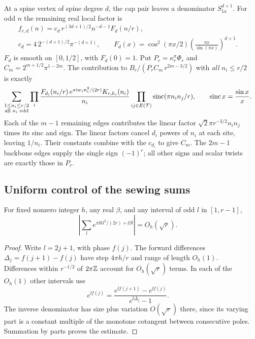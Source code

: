 At a spine vertex of spine degree \(d\), the cap pair leaves a denominator \(S_{1a}^{d+1}\). For odd \(n\) the remaining real local factor is
\[
\begin{gathered}
 f_{r,d}(n)=c_d\,r^{(3d+1)/2} n^{-d-1}F_d(n/r),\\[-1pt]
 c_d=4\,2^{-(d+1)/2}\pi^{-(d+1)},\qquad
 F_d(x)=\cos^2(\pi x/2)\left(\frac{\pi x}{\sin(\pi x)}\right)^{d+1}.
\end{gathered}
\]
\(F_d\) is smooth on \([0,1/2]\), with \(F_d(0)=1\). Put \(P_r=\kappa_r^\sigma\Phi_r\) and \(C_m=2^{m+1/2}\pi^{1-2m}\). The contribution to \(B_r/(P_r C_m\,r^{2m-3/2})\) with \emph{all} \(n_i\le r/2\) is exactly
\begin{equation}\label{eq:low}
 \sum_{\substack{1\le n_i\le r/2\\ \text{all }n_i\text{ odd}}}
    \prod_i\frac{F_{d_i}(n_i/r)\,e^{\pi\mathrm i w_i n_i^2/(2r)}K_{r,h_i}(n_i)}{n_i}
    \prod_{ij\in E(\mathcal T)}\operatorname{sinc}(\pi n_i n_j/r),
 \qquad \operatorname{sinc} x=\frac{\sin x}{x}.
\end{equation}
Each of the \(m-1\) remaining edges contributes the linear factor
\(\sqrt{2}\pi r^{-3/2}n_i n_j\) times its sinc and sign. The linear factors cancel \(d_i\) powers of \(n_i\) at each site, leaving \(1/n_i\). Their constants combine with the \(c_{d_i}\) to give \(C_m\). The \(2m-1\) backbone edges supply the single sign \((-1)^r\); all other signs and scalar twists are exactly those in \(P_r\).

\subsection{Uniform control of the sewing sums}
\begin{lemma}\label{lem:quadratic}
For fixed nonzero integer \(h\), any real \(\beta\), and any interval of odd \(l\) in \([1,r-1]\),
\[
 \left|\sum_l e^{\pi\ii h l^2/(2r)+\ii\beta l}\right|=O_h(\sqrt r).
\]
\end{lemma}
\begin{proof}
Write \(l=2j+1\), with phase \(f(j)\). The forward differences \(\Delta_j=f(j+1)-f(j)\) have step \(4\pi h/r\) and range of length \(O_h(1)\). Differences within \(r^{-1/2}\) of \(2\pi\mathbb Z\) account for \(O_h(\sqrt r)\) terms. In each of the \(O_h(1)\) other intervals use
\[
 e^{\ii f(j)}=\frac{e^{\ii f(j+1)}-e^{\ii f(j)}}{e^{\ii\Delta_j}-1}.
\]
The inverse denominator has size plus variation \(O(\sqrt r)\) there, since its varying part is a constant multiple of the monotone cotangent between consecutive poles. Summation by parts proves the estimate.
\end{proof}

